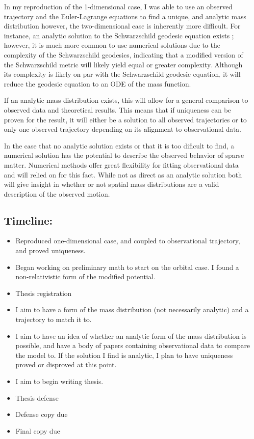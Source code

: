 \documentclass{article}
\let\cite\parencite
\begin{document}
In my reproduction of the 1-dimensional case, I was able to use an observed trajectory and the Euler-Lagrange equations to find a unique, and analytic mass distribution however, the two-dimensional case is inherently more difficult. For instance, an analytic solution to the Schwarzschild geodesic equation exists \cite{hackmannCompleteAnalyticSolution2008}; however, it is much more common to use numerical solutions due to the complexity of the Schwarzschild geodesics, indicating that a modified version of the Schwarzschild metric will likely yield equal or greater complexity. Although its complexity is likely on par with the Schwarzschild geodesic equation, it will reduce the geodesic equation to an ODE of the mass function. 

If an analytic mass distribution exists, this will allow for a general comparison to observed data and theoretical results. This means that if uniqueness can be proven for the result, it will either be a solution to all observed trajectories or to only one observed trajectory depending on its alignment to observational data.

In the case that no analytic solution exists or that it is too dificult to find, a numerical solution has the potential to describe the observed behavior of sparse matter. Numerical methods offer great flexibility for fitting observational data and will relied on for this fact. While not as direct as an analytic solution both will give insight in whether or not spatial mass distributions are a valid description of the observed motion.


\subsection*{Timeline:}
\begin{itemize}
    \item[\textbf{November-February:}]  Reproduced one-dimensional case, and coupled to observational trajectory, and proved uniqueness.
    \item[\textbf{March-April:}] Began working on preliminary math to start on the orbital case. I found a non-relativistic form of the modified potential. 
    \item[\textbf{April 22}] Thesis registration
    \item[\textbf{May:}] I aim to have a form of the mass distribution (not necessarily analytic) and a trajectory to match it to.
    \item[\textbf{June-July:}]  I aim to have an idea of whether an analytic form of the mass distribution is possible, and have a body of papers containing observational data to compare the model to. If the solution I find is analytic, I plan to have uniqueness proved or disproved at this point.
    \item[\textbf{August:}] I aim to begin writing thesis.
    \item[\textbf{Late August - November 1-3 :}] Thesis defense 
    \item[\textbf{November 4 :}] Defense copy due 
    \item[\textbf{November 10:}] Final copy due

\end{itemize}
\sloppy

\nocite{*}
\printbibheading
\printbibliography[category=cited,heading=subbibliography,title={Cited material}]
\printbibliography[title={Supplementary material},heading=subbibliography,notcategory=cited]
\end{document}
